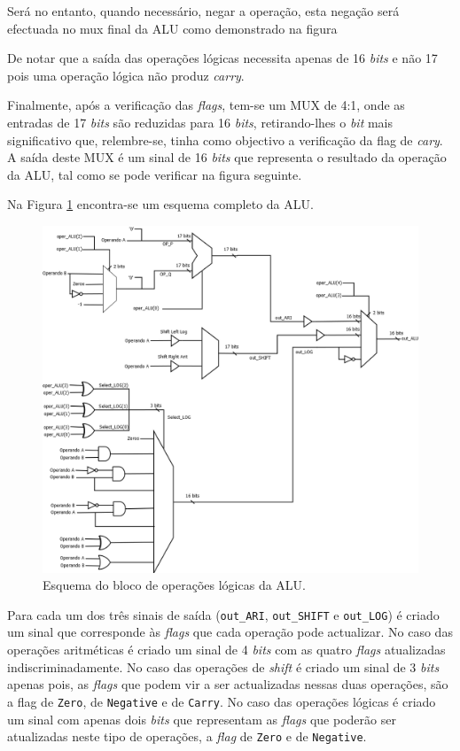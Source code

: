\documentclass[11pt]{article}
\numberwithin{equation}{section}
\begin{document}
Será no entanto, quando necessário, negar a operação, esta negação será efectuada no mux final da ALU como demonstrado na figura %

De notar que a saída das operações lógicas necessita apenas de 16 \textit{bits} e não 17 pois uma operação lógica não produz \textit{carry}.

Finalmente, após a verificação das \textit{flags}, tem-se um MUX de 4:1, onde as entradas de 17 \textit{bits} são reduzidas para 16 \textit{bits}, retirando-lhes o \textit{bit} mais significativo que, relembre-se, tinha como objectivo a verificação da flag de \textit{cary}. A saída deste MUX é um sinal de 16 \textit{bits} que representa o resultado da operação da ALU, tal como se pode verificar na figura seguinte.

Na Figura \ref{fig:ALU} encontra-se um esquema completo da ALU.

\begin{figure}[H]
	\centering
	\includegraphics[keepaspectratio=true, scale=0.40]{imagens/ALU}
	\caption{Esquema do bloco de operações lógicas da ALU.}
	\vspace{-0.8em}
	\label{fig:ALU}
\end{figure}

Para cada um dos três sinais de saída (\texttt{out\_ARI}, \texttt{out\_SHIFT} e \texttt{out\_LOG}) é criado um sinal que corresponde às \textit{flags} que cada operação pode actualizar. No caso das operações aritméticas é criado um sinal de 4 \textit{bits} com as quatro \textit{flags} atualizadas indiscriminadamente. No caso das operações de \textit{shift} é criado um sinal de 3 \textit{bits} apenas pois, as \textit{flags} que podem vir a ser actualizadas nessas duas operações, são a flag de \texttt{Zero}, de \texttt{Negative} e de \texttt{Carry}. No caso das operações lógicas é criado um sinal com apenas dois \textit{bits} que representam as \textit{flags} que poderão ser atualizadas neste tipo de operações, a \textit{flag} de \texttt{Zero} e de \texttt{Negative}.
\end{document}
